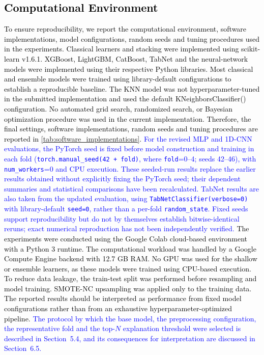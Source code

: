 \documentclass[a4paper,fleqn]{cas-sc}
\begin{document}
\subsection{\textcolor{black}{Computational Environment}}
\textcolor{black}{To ensure reproducibility, we report the computational environment, software implementations, model configurations, random seeds and tuning procedures used in the experiments. Classical learners and stacking were implemented using scikit-learn v1.6.1. XGBoost, LightGBM, CatBoost, TabNet and the neural-network models were implemented using their respective Python libraries.
Most classical and ensemble models were trained using library-default configurations to establish a reproducible baseline. The KNN model was not hyperparameter-tuned in the submitted implementation and used the default KNeighborsClassifier() configuration. No automated grid search, randomized search, or Bayesian optimization procedure was used in the current implementation. Therefore, the final settings, software implementations, random seeds and tuning procedures are reported in \cref{tab:software_implementations}. \textcolor{blue}{For the revised MLP and 1D-CNN evaluations, the PyTorch seed is fixed before model construction and training in each fold (\texttt{torch.manual\_seed(42 + fold)}, where \texttt{fold}=0--4; seeds 42--46), with \texttt{num\_workers}=0 and CPU execution. These seeded-run results replace the earlier results obtained without explicitly fixing the PyTorch seed; their dependent summaries and statistical comparisons have been recalculated. TabNet results are also taken from the updated evaluation, using \texttt{TabNetClassifier(verbose=0)} with library-default \texttt{seed=0}, rather than a per-fold \texttt{random\_state}. Fixed seeds support reproducibility but do not by themselves establish bitwise-identical reruns; exact numerical reproduction has not been independently verified.}
The experiments were conducted using the Google Colab cloud-based environment with a Python 3 runtime. The computational workload was handled by a Google Compute Engine backend with 12.7 GB RAM. No GPU was used for the shallow or ensemble learners, as these models were trained using CPU-based execution.
To reduce data leakage, the train-test split was performed before resampling and model training. SMOTE-NC upsampling was applied only to the training data. The reported results should be interpreted as performance from fixed model configurations rather than from an exhaustive hyperparameter-optimized pipeline. \textcolor{blue}{The protocol by which the base model, the preprocessing configuration, the representative fold and the top-$N$ explanation threshold were selected is described in Section~5.4, and its consequences for interpretation are discussed in Section~6.5.}}
\end{document}
